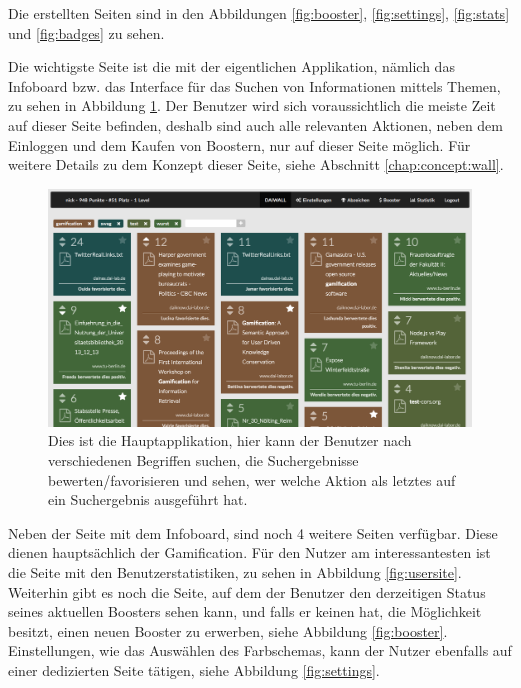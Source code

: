 \documentclass[12pt,twoside]{book}
\begin{document}
Die erstellten Seiten sind in den Abbildungen \ref{fig:booster}, \ref{fig:settings}, \ref{fig:stats} und \ref{fig:badges} zu sehen.

Die wichtigste Seite ist die mit der eigentlichen Applikation, nämlich das Infoboard bzw. das Interface für das Suchen von Informationen mittels Themen, zu sehen in Abbildung \ref{fig:wall}. Der Benutzer wird sich voraussichtlich die meiste Zeit auf dieser Seite befinden, deshalb sind auch alle relevanten Aktionen, neben dem Einloggen und dem Kaufen von Boostern, nur auf dieser Seite möglich. Für weitere Details zu dem Konzept dieser Seite, siehe Abschnitt \ref{chap:concept:wall}.

\begin{figure}[htbp]
    \centering
    \includegraphics[width=1.0\textwidth]{images/infoboard_wall.png}
    \caption{Dies ist die Hauptapplikation, hier kann der Benutzer nach verschiedenen Begriffen suchen, die Suchergebnisse bewerten/favorisieren und sehen, wer welche Aktion als letztes auf ein Suchergebnis ausgeführt hat.}\label{fig:wall}
\end{figure}

Neben der Seite mit dem Infoboard, sind noch 4 weitere Seiten verfügbar. Diese dienen hauptsächlich der Gamification. Für den Nutzer am interessantesten ist die Seite mit den Benutzerstatistiken, zu sehen in Abbildung \ref{fig:usersite}.
Weiterhin gibt es noch die Seite, auf dem der Benutzer den derzeitigen Status seines aktuellen Boosters sehen kann, und falls er keinen hat, die Möglichkeit besitzt, einen neuen Booster zu erwerben, siehe Abbildung \ref{fig:booster}. Einstellungen, wie das Auswählen des Farbschemas, kann der Nutzer ebenfalls auf einer dedizierten Seite tätigen, siehe Abbildung \ref{fig:settings}.
\end{document}
